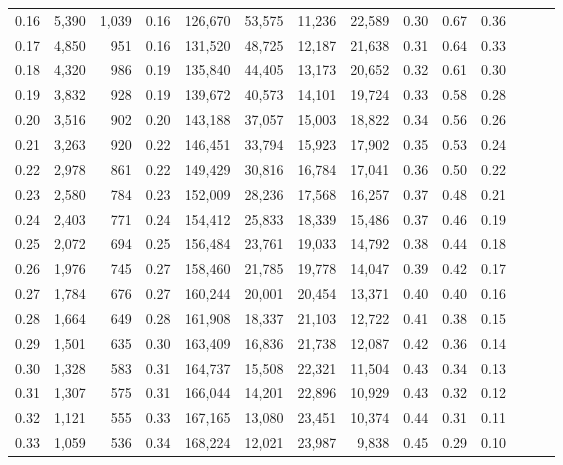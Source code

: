 \begin{tabular}{rrrrrrrrrrrrrr}
0.16 &   5,390 &  1,039 &  0.16 &  126,670 &   53,575 &  11,236 &  22,589 &  0.30 &  0.67 &      0.36 \\
0.17 &   4,850 &    951 &  0.16 &  131,520 &   48,725 &  12,187 &  21,638 &  0.31 &  0.64 &      0.33 \\
0.18 &   4,320 &    986 &  0.19 &  135,840 &   44,405 &  13,173 &  20,652 &  0.32 &  0.61 &      0.30 \\
0.19 &   3,832 &    928 &  0.19 &  139,672 &   40,573 &  14,101 &  19,724 &  0.33 &  0.58 &      0.28 \\
0.20 &   3,516 &    902 &  0.20 &  143,188 &   37,057 &  15,003 &  18,822 &  0.34 &  0.56 &      0.26 \\
0.21 &   3,263 &    920 &  0.22 &  146,451 &   33,794 &  15,923 &  17,902 &  0.35 &  0.53 &      0.24 \\
0.22 &   2,978 &    861 &  0.22 &  149,429 &   30,816 &  16,784 &  17,041 &  0.36 &  0.50 &      0.22 \\
0.23 &   2,580 &    784 &  0.23 &  152,009 &   28,236 &  17,568 &  16,257 &  0.37 &  0.48 &      0.21 \\
0.24 &   2,403 &    771 &  0.24 &  154,412 &   25,833 &  18,339 &  15,486 &  0.37 &  0.46 &      0.19 \\
0.25 &   2,072 &    694 &  0.25 &  156,484 &   23,761 &  19,033 &  14,792 &  0.38 &  0.44 &      0.18 \\
0.26 &   1,976 &    745 &  0.27 &  158,460 &   21,785 &  19,778 &  14,047 &  0.39 &  0.42 &      0.17 \\
0.27 &   1,784 &    676 &  0.27 &  160,244 &   20,001 &  20,454 &  13,371 &  0.40 &  0.40 &      0.16 \\
0.28 &   1,664 &    649 &  0.28 &  161,908 &   18,337 &  21,103 &  12,722 &  0.41 &  0.38 &      0.15 \\
0.29 &   1,501 &    635 &  0.30 &  163,409 &   16,836 &  21,738 &  12,087 &  0.42 &  0.36 &      0.14 \\
0.30 &   1,328 &    583 &  0.31 &  164,737 &   15,508 &  22,321 &  11,504 &  0.43 &  0.34 &      0.13 \\
0.31 &   1,307 &    575 &  0.31 &  166,044 &   14,201 &  22,896 &  10,929 &  0.43 &  0.32 &      0.12 \\
0.32 &   1,121 &    555 &  0.33 &  167,165 &   13,080 &  23,451 &  10,374 &  0.44 &  0.31 &      0.11 \\
0.33 &   1,059 &    536 &  0.34 &  168,224 &   12,021 &  23,987 &   9,838 &  0.45 &  0.29 &      0.10 \\

\end{tabular}
